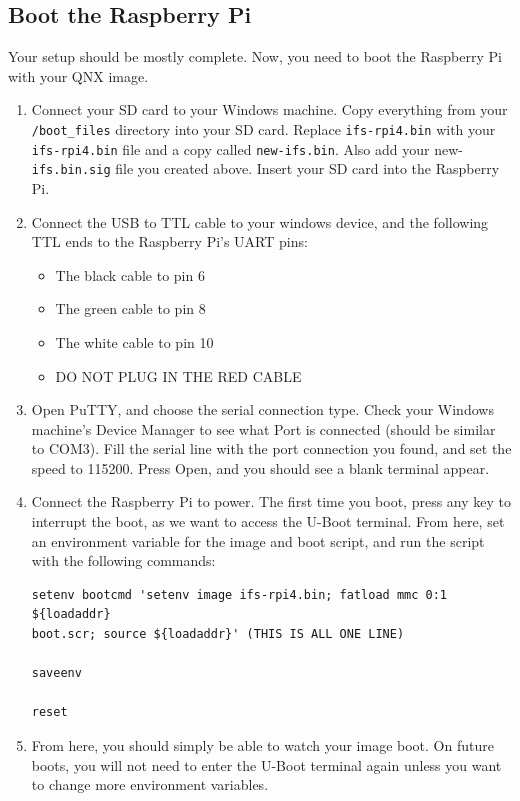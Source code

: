 \documentclass[12pt]{article}
\begin{document}
\subsection{Boot the Raspberry Pi}
Your setup should be mostly complete. Now, you need to boot the Raspberry Pi with your QNX image.
\begin{enumerate}
    \item Connect your SD card to your Windows machine. Copy everything from your \texttt{/boot\_files} directory into your SD card. Replace \texttt{ifs-rpi4.bin} with your \texttt{ifs-rpi4.bin} file and a copy called \texttt{new-ifs.bin}. Also add your new-\texttt{ifs.bin.sig} file you created above. Insert your SD card into the Raspberry Pi.
    \item Connect the USB to TTL cable to your windows device, and the following TTL ends to the Raspberry Pi's UART pins:
    \begin{itemize}
        \item The black cable to pin 6
        \item The green cable to pin 8
        \item The white cable to pin 10
        \item DO NOT PLUG IN THE RED CABLE
    \end{itemize}
    \item Open PuTTY, and choose the serial connection type. Check your Windows machine's Device Manager to see what Port is connected (should be similar to COM3). Fill the serial line with the port connection you found, and set the speed to 115200. Press Open, and you should see a blank terminal appear.
    \item Connect the Raspberry Pi to power. The first time you boot, press any key to interrupt the boot, as we want to access the U-Boot terminal. From here, set an environment variable for the image and boot script, and run the script with the following commands:
    \begin{verbatim}
setenv bootcmd 'setenv image ifs-rpi4.bin; fatload mmc 0:1 ${loadaddr}
boot.scr; source ${loadaddr}' (THIS IS ALL ONE LINE)

saveenv

reset
    \end{verbatim}
    \item From here, you should simply be able to watch your image boot. On future boots, you will not need to enter the U-Boot terminal again unless you want to change more environment variables.
\end{enumerate}
\end{document}

